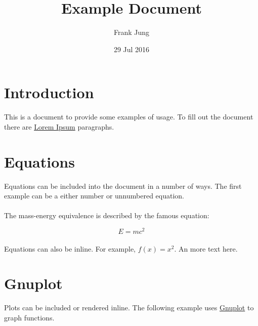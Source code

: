 \documentclass[11pt,a4paper]{article}
\title{\LaTeXe{} Example Document}
\author{Frank Jung}
\date{29 Jul 2016}
\begin{document}
\maketitle
\newpage

\tableofcontents{}
\listoffigures
\newpage

\newpage

\newcommand{\sectionbreak}{\clearpage}

\section*{Introduction}

This is a \LaTeXe{} document to provide some examples of usage. To fill out the
document there are \href{http://www.lipsum.com/}{Lorem Ipsum} paragraphs.

\lipsum[1]

\sectionbreak{}

\section*{Equations}

Equations can be included into the document in a number of ways. The first
example can be a either number or unnumbered equation.

\paragraph{}
The mass-energy equivalence is described by the famous equation:

\begin{equation}
  E = mc^2
\end{equation}

\paragraph{}
Equations can also be inline. For example, $f(x) = x^2$. An more text here.
\lipsum[2]

\sectionbreak{}

\section*{Gnuplot}

Plots can be included or rendered inline. The following example uses
\href{http://www.gnuplot.info/}{Gnuplot} to graph functions.
\end{document}
